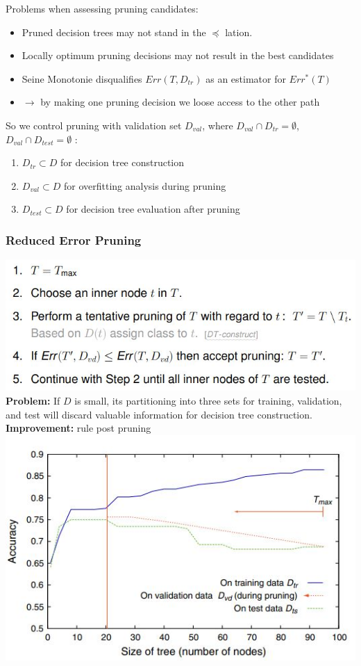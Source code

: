 \documentclass[11pt,a4paper]{article}
\begin{document}
\begin{flushleft}
Problems when assessing pruning candidates:
\begin{itemize}
\item Pruned decision trees may not stand in the $ \preceq $ lation.
\item Locally optimum pruning decisions may not result in the best candidates
\item Seine Monotonie disqualifies $Err(T, D_{tr})$ as an estimator for $Err^*(T)$
\item $\rightarrow $ by making one pruning decision we loose access to the other path
\end{itemize}
So we control pruning with validation set $D_{val}$, where $D_{val} \cap D_{tr} = \emptyset $, $D_{val} \cap D_{test} = \emptyset $ :
\begin{enumerate}
\item $D_{tr} \subset D $ for decision tree construction
\item $D_{val} \subset D $ for overfitting analysis during pruning
\item $D_{test} \subset D $ for decision tree evaluation after pruning
\end{enumerate}

\subsubsection{Reduced Error Pruning}
\includegraphics[width = \textwidth]{Errorpruning}
\textbf{Problem:} If $D$ is small, its partitioning into three sets for training, validation, and test will
discard valuable information for decision tree construction. \\
\textbf{Improvement:} rule post pruning
\includegraphics[width = \textwidth]{pruningGraph}


\end{flushleft}
\end{document}
